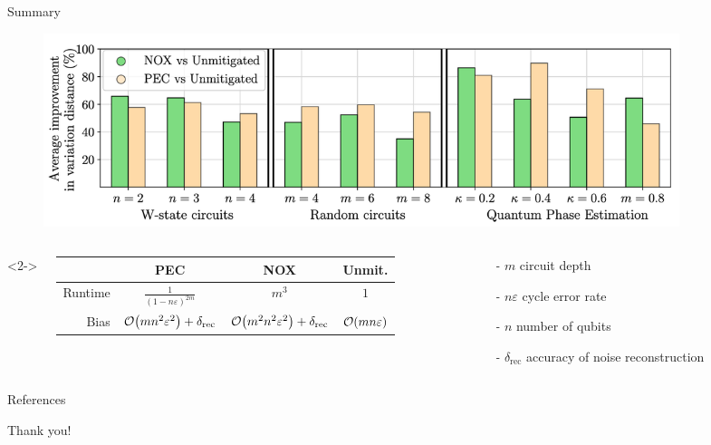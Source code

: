 \documentclass[11pt,aspectratio=1610,xcolor=dvipsnames]{beamer}
\begin{document}
\begin{frame}{Summary}
	\begin{figure}[h]
		\centering
		\includegraphics[width=0.9\textwidth]{results.png}
	\end{figure}
	\begin{columns}<2->
		\begin{column}{0.7\textwidth}
			\begin{table}[h]
				\centering\begin{tabular}{r | c  c  c}
					        & PEC                                             & NOX                                               & Unmit.                  \\ \toprule
					Runtime & $\frac{1}{(1-n\varepsilon)^{2m}}$               & $m^3$                                             & $1$                     \\
					Bias    & $\order{mn^2\varepsilon^2} + \delta_\text{rec}$ & $\order{m^2n^2\varepsilon^2} + \delta_\text{rec}$ & $\order{mn\varepsilon}$
				\end{tabular}
			\end{table}
		\end{column}
		\begin{column}{0.35\textwidth}
			\begin{tcolorbox}[variables]
				- $m$ circuit depth

				- $n\varepsilon$ cycle error rate

				- $n$ number of qubits

				- $\delta_\text{rec}$ accuracy of noise reconstruction
			\end{tcolorbox}
		\end{column}
	\end{columns}
\end{frame}

\begin{frame}{References}
	\nocite{*}
	\printbibliography[heading=none]
\end{frame}

\begin{frame}[standout]
	Thank you!
\end{frame}
\end{document}
